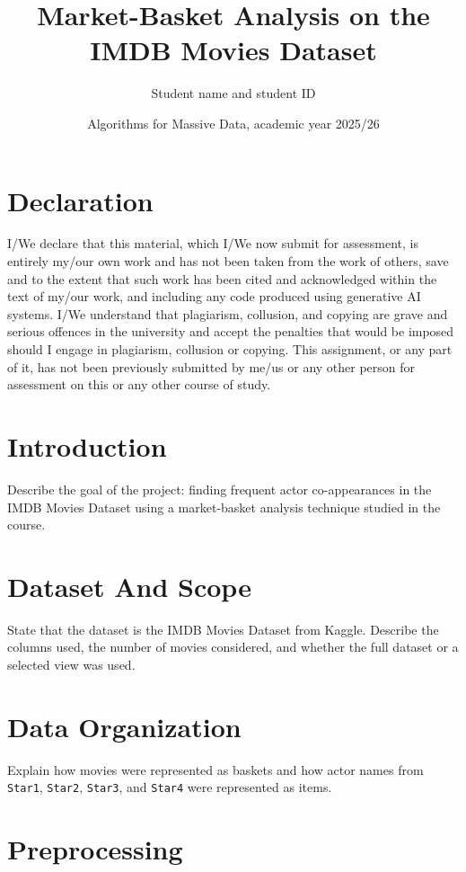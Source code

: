 \documentclass[11pt,a4paper]{article}
\title{Market-Basket Analysis on the IMDB Movies Dataset}
\author{Student name and student ID}
\date{Algorithms for Massive Data, academic year 2025/26}
\begin{document}
\maketitle

\section*{Declaration}

I/We declare that this material, which I/We now submit for assessment, is
entirely my/our own work and has not been taken from the work of others, save
and to the extent that such work has been cited and acknowledged within the
text of my/our work, and including any code produced using generative AI
systems. I/We understand that plagiarism, collusion, and copying are grave and
serious offences in the university and accept the penalties that would be
imposed should I engage in plagiarism, collusion or copying. This assignment,
or any part of it, has not been previously submitted by me/us or any other
person for assessment on this or any other course of study.

\section{Introduction}

Describe the goal of the project: finding frequent actor co-appearances in the
IMDB Movies Dataset using a market-basket analysis technique studied in the
course.

\section{Dataset And Scope}

State that the dataset is the IMDB Movies Dataset from Kaggle. Describe the
columns used, the number of movies considered, and whether the full dataset or
a selected view was used.

\section{Data Organization}

Explain how movies were represented as baskets and how actor names from
\texttt{Star1}, \texttt{Star2}, \texttt{Star3}, and \texttt{Star4} were
represented as items.

\section{Preprocessing}
\end{document}
